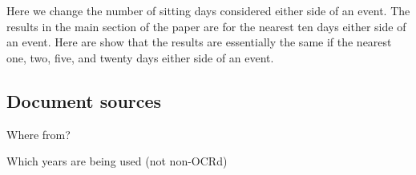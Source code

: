 \documentclass[12pt,]{article}
\begin{document}
Here we change the number of sitting days considered either side of an
event. The results in the main section of the paper are for the nearest
ten days either side of an event. Here are show that the results are
essentially the same if the nearest one, two, five, and twenty days
either side of an event.

\subsection{Document sources}\label{document-sources}

Where from?

Which years are being used (not non-OCRd)

\newpage




\newpage
\singlespacing 
\renewcommand\refname{References}

\end{document}
